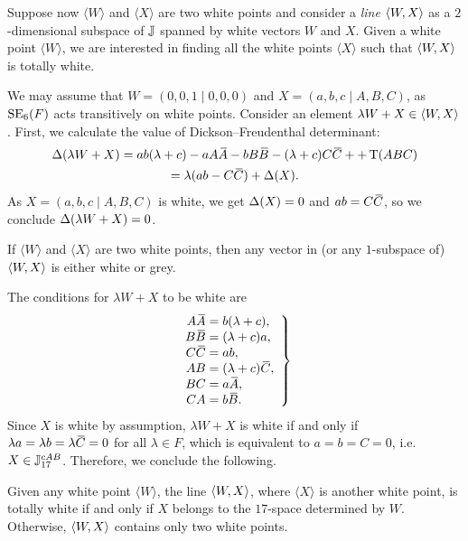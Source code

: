 
Suppose now $\langle W \rangle$ and 
$\langle X \rangle$ are two white points and consider a \textit{line} $\langle W, X \rangle$ as 
a $2$-dimensional subspace of $\mathbb{J}$ spanned by white vectors $W$ and $X$. 
Given a white point $\langle W \rangle$, we are interested in finding all
the white points $\langle X \rangle$ such that $\langle W, X \rangle$ is totally white. 

We may assume that 
\mbox{$W = (0,0,1\mid 0,0,0)$} and $X = (a,b,c\mid A,B,C)$, as $\mathrm{SE}_6(F)$ acts transitively on white points. 
Consider an element $\lambda W + X \in \langle W, X \rangle$. First, we calculate the 
value of Dickson--Freudenthal determinant:
\begin{multline}
	\fdet( \lambda W + X ) = ab(\lambda + c) - a A \ovA - b B \ovB - (\lambda + c) C \ovC + 
		+ \Tr(ABC) \\
		= \lambda( ab - C\ovC ) + \fdet(X).
\end{multline}
As $X = (a,b,c\mid A,B,C)$ is white, we get $\Delta(X) = 0$ and $ab = C\mathord{\mbox{\hspace*{0pt}}\,\overline{\!C\!\!\;}\!\:}\mbox{\hspace*{0pt}}$, so
we conclude $\Delta( \lambda W + X) = 0$.

\begin{proposition}
	\label{prop:lines}
	If $\langle W \rangle$ and $\langle X \rangle$ are two white points, then any vector in
	(or any $1$-subspace of) $\langle W, X \rangle$ is either white or grey.
\end{proposition}

The conditions for $\lambda W + X$ to be white are
\begin{equation}
	\left.
		\begin{array}{r@{\;}c@{\;}l}
			A\ovA & = & b (\lambda + c), \\
			B\ovB & = & (\lambda + c) a, \\
			C\ovC & = & ab, \\
			AB & = & (\lambda + c) \ovC, \\
			BC & = & a\ovA, \\
			CA & = & b\ovB. 
		\end{array}
	\right\}
\end{equation}
Since $X$ is white by assumption, $\lambda W + X$ is white if and only if
$\lambda a = \lambda b = \lambda \mathord{\mbox{\hspace*{0pt}}\,\overline{\!C\!\!\;}\!\:}\mbox{\hspace*{0pt}} = 0$ for all $\lambda \in F$, which is equivalent to
$a = b = C = 0$, i.e. $X \in \mathbb{J}_{17}^{cAB}$. Therefore, we conclude the following.

\begin{proposition}
	\label{prop:white_lines}
	Given any white point $\langle W \rangle$, the line $\langle W, X \rangle$, where $\langle X \rangle$
	is another white point, is totally white if and only if $X$ belongs to the $17$-space 
	determined by $W$. Otherwise, $\langle W, X \rangle$ contains only two white points. 
\end{proposition}

